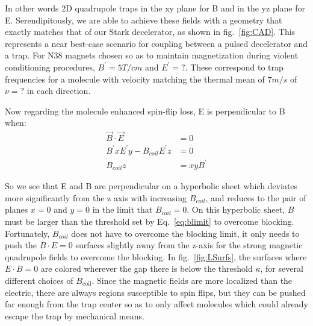 \documentclass[%
 reprint,
 amsmath,amssymb,
 aps,
prl,
]{revtex4-1}
\begin{document}
\noindent In other words 2D quadrupole traps in the xy plane for B and in the yz plane for E. Serendipitously, we are able to achieve these fields with a geometry that exactly matches that of our Stark decelerator, as shown in fig.~\ref{fig:CAD}. This represents a near best-case scenario for coupling between a pulsed decelerator and a trap. For N38 magnets chosen so as to maintain magnetization during violent conditioning procedures, $B^\prime=5 T/cm$ and $E^\prime=?$. These correspond to trap frequencies for a molecule with velocity matching the thermal mean of $7m/s$ of $\nu=?$ in each direction.

Now regarding the molecule enhanced spin-flip loss, E is perpendicular to B when:
\begin{eqnarray}
\vec{B}\cdot \vec{E} &= 0\\
B^\prime x E^\prime y - B_{coil}  E^\prime z &= 0\\
B_{coil}z &= xyB^\prime
\end{eqnarray}

So we see that E and B are perpendicular on a hyperbolic sheet which deviates more significantly from the z axis with increasing $B_{coil}$, and reduces to the pair of planes $x=0$ and $y=0$ in the limit that $B_{coil} = 0$. On this hyperbolic sheet, $B$ must be larger than the threshold set by Eq.~\ref{eq:blimit} to overcome blocking. Fortunately, $B_{coil}$ does not have to overcome the blocking limit, it only needs to push the $B\cdot E=0$ surfaces slightly away from the z-axis for the strong magnetic quadrupole fields to overcome the blocking. In fig.~\ref{fig:LSurfs}, the surfaces where $E\cdot B=0$ are colored wherever the gap there is below the threshold $\kappa$, for several different choices of $B_\text{coil}$. Since the magnetic fields are more localized than the electric, there are always regions susceptible to spin flips, but they can be pushed far enough from the trap center so as to only affect molecules which could already escape the trap by mechanical means. 
\end{document}
